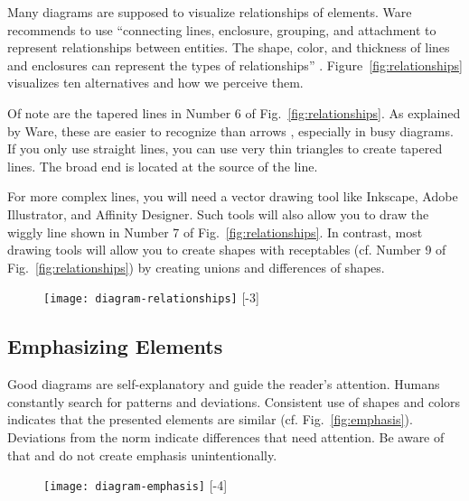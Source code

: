 Many diagrams are supposed to visualize relationships of elements. Ware recommends to use ``connecting lines, enclosure, grouping, and attachment to represent relationships between entities. The shape, color, and thickness of lines and enclosures can represent the types of relationships'' \cite{Ware12}. Figure~\ref{fig:relationships} visualizes ten alternatives and how we perceive them.

Of note are the tapered lines in Number 6 of Fig.~\ref{fig:relationships}. As explained by Ware, these are easier to recognize than arrows \cite{Ware12}, especially in busy diagrams. If you only use straight lines, you can use very thin triangles to create tapered lines. The broad end is located at the source of the line.

For more complex lines, you will need a vector drawing tool like Inkscape, Adobe Illustrator, and Affinity Designer. Such tools will also allow you to draw the wiggly line shown in Number 7 of Fig.~\ref{fig:relationships}. In contrast, most drawing tools will allow you to create shapes with receptables (cf. Number 9 of Fig.~\ref{fig:relationships}) by creating unions and differences of shapes.



\begin{figure}[t]
\centering
\texttt{[image: diagram-relationships]}
[-3\baselineskip]
\end{figure}



\subsection{Emphasizing Elements}

Good diagrams are self-explanatory and guide the reader's attention. Humans constantly search for patterns and deviations. Consistent use of shapes and colors indicates that the presented elements are similar (cf. Fig.~\ref{fig:emphasis}). Deviations from the norm indicate differences that need attention. Be aware of that and do not create emphasis unintentionally.

\begin{figure}[t]
\centering
\texttt{[image: diagram-emphasis]}
[-4\baselineskip]
\end{figure}

